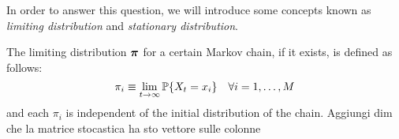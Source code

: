 \smallskip
In order to answer this question, we will introduce some concepts known as \emph{limiting distribution} and \emph{stationary distribution}.

\begin{ndef}
The limiting distribution $\boldsymbol{\pi}$ for a certain Markov chain, if it exists, is defined as follows:
\begin{equation}
    \pi_i \equiv \lim_{t \rightarrow \infty} \mathbb{P}\{X_t = x_i\} \quad \forall i=1,\dots,M
\end{equation}
and each $\pi_i$ is independent of the initial distribution of the chain.
Aggiungi dim che la matrice stocastica ha sto vettore sulle colonne
\end{ndef}